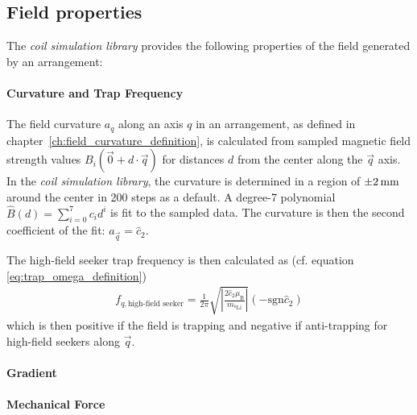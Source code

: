 \subsection*{Field properties}
The \textit{coil simulation library} provides the following properties of the field generated by an arrangement:

\paragraph{Curvature and Trap Frequency}
The field curvature $a_q$ along an axis $q$ in an arrangement, as defined in chapter~\ref{ch:field_curvature_definition}, is calculated from sampled magnetic field strength values $B_i(\vec 0 + d \cdot \vec q)$ for distances $d$ from the center along the $\vec q$ axis. In the \textit{coil simulation library}, the curvature is determined in a region of $\SI{+-2}{\milli\meter}$ around the center in \SI{200}{} steps as a default. A degree-7 polynomial $\hat B(d) = \sum\limits_{i=0}^7 c_i d^i$ is fit to the sampled data. The curvature is then the second coefficient of the fit: $a_{\vec q} = \hat c_2$.

The high-field seeker trap frequency is then calculated as (cf. equation \eqref{eq:trap_omega_definition})
\begin{align}
    f_{q, \text{high-field seeker}} = \frac{1}{2\pi}  \sqrt{\left| \frac{2 \hat c_2 \mu_\text{B}}{m_{^6\text{Li}}} \right|} (-\mathrm{sgn} \hat c_2)
\end{align}
which is then positive if the field is trapping and negative if anti-trapping for high-field seekers along $\vec q$.

\paragraph{Gradient}


\paragraph{Mechanical Force}






